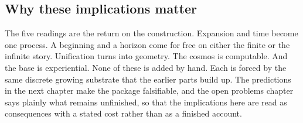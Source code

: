 \subsection{Why these implications matter}

The five readings are the return on the construction. Expansion and time become one process. A beginning and a horizon come for free on either the finite or the infinite story. Unification turns into geometry. The cosmos is computable. And the base is experiential. None of these is added by hand. Each is forced by the same discrete growing substrate that the earlier parts build up. The predictions in the next chapter make the package falsifiable, and the open problems chapter says plainly what remains unfinished, so that the implications here are read as consequences with a stated cost rather than as a finished account.
